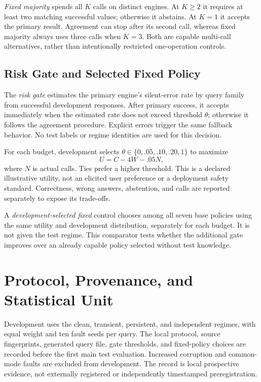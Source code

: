 \documentclass{svproc}
\begin{document}
\emph{Fixed majority} spends all $K$ calls on distinct engines. At $K\geq2$ it requires at least two matching successful values; otherwise it abstains. At $K=1$ it accepts the primary result. Agreement can stop after its second call, whereas fixed majority always uses three calls when $K=3$. Both are capable multi-call alternatives, rather than intentionally restricted one-operation controls.

\subsection{Risk Gate and Selected Fixed Policy}
The \emph{risk gate} estimates the primary engine's silent-error rate by query family from successful development responses. After primary success, it accepts immediately when the estimated rate does not exceed threshold $\theta$; otherwise it follows the agreement procedure. Explicit errors trigger the same fallback behavior. No test labels or regime identities are used for this decision.

For each budget, development selects $\theta\in\{0,.05,.10,.20,1\}$ to maximize
\begin{equation}
U=C-4W-.05N,
\label{eq:utility}
\end{equation}
where $N$ is actual calls. Ties prefer a higher threshold. This is a declared illustrative utility, not an elicited user preference or a deployment safety standard. Correctness, wrong answers, abstention, and calls are reported separately to expose its trade-offs.

A \emph{development-selected fixed} control chooses among all seven base policies using the same utility and development distribution, separately for each budget. It is not given the test regime. This comparator tests whether the additional gate improves over an already capable policy selected without test knowledge.

\section{Protocol, Provenance, and Statistical Unit}
Development uses the clean, transient, persistent, and independent regimes, with equal weight and ten fault seeds per query. The local protocol, source fingerprints, generated query file, gate thresholds, and fixed-policy choices are recorded before the first main test evaluation. Increased corruption and common-mode faults are excluded from development. The record is local prospective evidence, not externally registered or independently timestamped preregistration.
\end{document}
